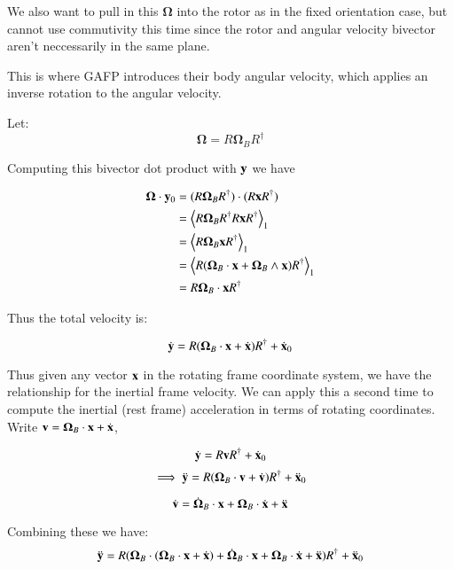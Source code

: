 \documentclass{article}      %
\newcommand{\dt}[1]{\dot{#1}}
\newcommand{\ddt}[1]{\ddot{#1}}
\newcommand{\gpgradeone}[1] {{\left\langle{{#1}}\right\rangle}_{1}}
\newcommand{\BOmega}[0]{\boldsymbol{\Omega}}
\begin{document}
We also want to pull in this $\BOmega$ into the rotor as in the fixed orientation
case, but cannot use commutivity this time since the rotor and angular velocity bivector aren't neccessarily in the same plane.

This is where GAFP introduces their body angular velocity, which applies an inverse rotation to the angular velocity.

Let:
\[
\BOmega = R \BOmega_B R^\dagger
\]

Computing this bivector dot product with $\mathbf{y}$ we have

\begin{align*}
\BOmega \cdot \By_0
&= (R \BOmega_B R^\dagger) \cdot (R \Bx R^\dagger) \\
&= \gpgradeone{R \BOmega_B R^\dagger R \Bx R^\dagger} \\
&= \gpgradeone{R \BOmega_B \Bx R^\dagger} \\
&= \gpgradeone{R (\BOmega_B \cdot \Bx + \BOmega_B \wedge \Bx) R^\dagger} \\
&= {R \BOmega_B \cdot \Bx R^\dagger} \\
\end{align*}

Thus the total velocity is:

\begin{equation}
\dt{\By} = {R (\BOmega_B \cdot \Bx + \dt{\Bx} )R^\dagger} + \dt{\Bx}_0
\end{equation}

Thus given any vector $\mathbf{x}$ in the rotating frame coordinate system, we have the relationship for the inertial frame velocity.  We can apply this a second
time to compute the inertial (rest frame) acceleration in terms of rotating coordinates.  Write $\Bv = \BOmega_B \cdot \Bx + \dt{\Bx}$, 

\begin{equation*}
\dt{\By} = {R \Bv R^\dagger} + \dt{\Bx}_0
\end{equation*}
\begin{equation*}
\implies
\ddt{\By} = {R (\BOmega_B \cdot \Bv + \dt{\Bv} ) R^\dagger} + \ddt{\Bx}_0
\end{equation*}

\[
\dt{\Bv} = 
\dt{\BOmega}_B \cdot \Bx 
+\BOmega_B \cdot \dt{\Bx}
+ \ddt{\Bx}
\]

Combining these we have:
\begin{align*}
\ddt{\By} 
&= {R (\BOmega_B \cdot ( \BOmega_B \cdot \Bx + \dt{\Bx} ) + \dt{\BOmega}_B \cdot \Bx +\BOmega_B \cdot \dt{\Bx} + \ddt{\Bx}) R^\dagger} + \ddt{\Bx}_0 \\
\end{align*}
\end{document}
